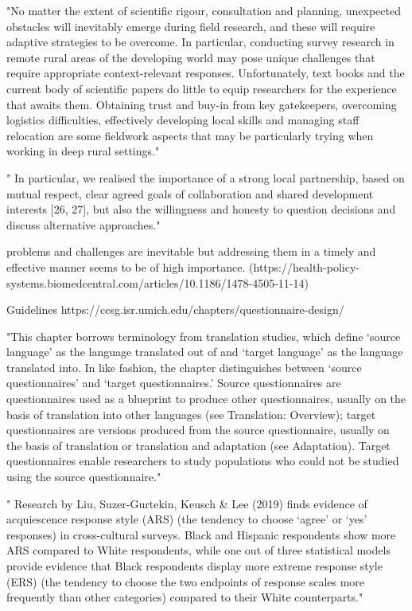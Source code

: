 "No matter the extent of scientific rigour, consultation and planning, unexpected obstacles will inevitably emerge during field research, and these will require adaptive strategies to be overcome. In particular, conducting survey research in remote rural areas of the developing world may pose unique challenges that require appropriate context-relevant responses. Unfortunately, text books and the current body of scientific papers do little to equip researchers for the experience that awaits them. Obtaining trust and buy-in from key gatekeepers, overcoming logistics difficulties, effectively developing local skills and managing staff relocation are some fieldwork aspects that may be particularly trying when working in deep rural settings."

" In particular, we realised the importance of a strong local partnership, based on mutual respect, clear agreed goals of collaboration and shared development interests [26, 27], but also the willingness and honesty to question decisions and discuss alternative approaches."

problems and challenges are inevitable but addressing them in a timely and effective manner seems to be of high importance. (https://health-policy-systems.biomedcentral.com/articles/10.1186/1478-4505-11-14)






Guidelines https://ccsg.isr.umich.edu/chapters/questionnaire-design/

"This chapter borrows terminology from translation studies, which define ‘source language’ as the language translated out of and ‘target language’ as the language translated into. In like fashion, the chapter distinguishes between ‘source questionnaires’ and ‘target questionnaires.’ Source questionnaires are questionnaires used as a blueprint to produce other questionnaires, usually on the basis of translation into other languages (see Translation: Overview); target questionnaires are versions produced from the source questionnaire, usually on the basis of translation or translation and adaptation (see Adaptation). Target questionnaires enable researchers to study populations who could not be studied using the source questionnaire."

" Research by Liu, Suzer-Gurtekin, Keusch & Lee (2019) finds evidence of acquiescence response style (ARS) (the tendency to choose ‘agree’ or ‘yes’ responses) in cross-cultural surveys. Black and Hispanic respondents show more ARS compared to White respondents, while one out of three statistical models provide evidence that Black respondents display more extreme response style (ERS) (the tendency to choose the two endpoints of response scales more frequently than other categories) compared to their White counterparts."

